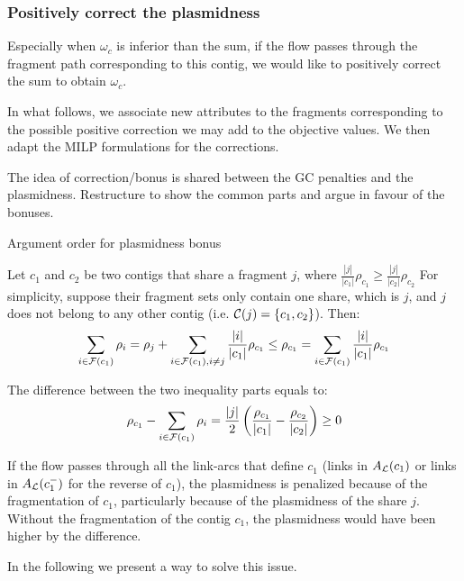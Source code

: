 \subsubsection{Positively correct the plasmidness}\label{sec:pbf_iterbin:decomp:mps:fine_tuned}

Especially when \(\omega_c\) is inferior than the sum, if the flow passes through the fragment path corresponding to this contig, we would like to positively correct the sum to obtain \(\omega_c\).

In what follows, we associate new attributes to the fragments corresponding to the possible positive correction we may add to the objective values.
We then adapt the MILP formulations for the corrections.

\begin{refactorbox}
  The idea of correction/bonus is shared between the GC penalties and the plasmidness.
  Restructure to show the common parts and argue in favour of the bonuses.
\end{refactorbox}

\begin{fixmebox}
  Argument order for plasmidness bonus
\end{fixmebox}

Let \(c_1\) and \(c_2\) be two contigs that share a fragment \(j\), where \(\frac{ |j| }{ |c_1| } \rho_{c_1} \geq \frac{ |j| }{ |c_2| } \rho_{c_2}\)
For simplicity, suppose their fragment sets only contain one share, which is \(j\), and \(j\) does not belong to any other contig (i.e. \(\mathcal{C}(j) = \{c_1, c_2\} \)).
Then:
\[
  \sum_{i \in \mathcal{F}{}(c_1) } \rho_{i} = \rho_{j} + \sum_{i \in \mathcal{F}{}(c_1), i \neq j} \frac{ |i| }{ |c_1| } \rho_{c_1} \leq \rho_{c_1} = \sum_{i \in \mathcal{F}{}(c_1) } \frac{ |i| }{ |c_1| } \rho_{c_1}
\]

The difference between the two inequality parts equals to:
\[
  \rho_{c_1} - \sum_{i \in \mathcal{F}{}(c_1) } \rho_{i} = \frac{ |j| }{2} \left(\frac{ \rho_{c_1} }{ |c_1| } - \frac{ \rho_{c_2} }{ |c_2| } \right) \geq 0
\]

If the flow passes through all the link-arcs that define \(c_1\) (links in \(A_{\mathcal{L}}{}(c_1)\) or links in \(A_{\mathcal{L}}{}(c_1^-)\) for the reverse of \(c_1\)), the plasmidness is penalized because of the fragmentation of \(c_1\), particularly because of the plasmidness of the share \(j\).
Without the fragmentation of the contig \(c_1\), the plasmidness would have been higher by the difference.

In the following we present a way to solve this issue.

